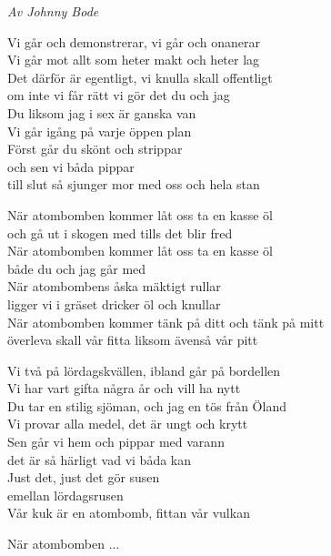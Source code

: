 {\footnotesize\textit{Av Johnny Bode}}\par
\vspace{10pt}
Vi går och demonstrerar, vi går och onanerar\\
Vi går mot allt som heter makt och heter lag\\
Det därför är egentligt, vi knulla skall offentligt\\
om inte vi får rätt vi gör det du och jag\\
Du liksom jag i sex är ganska van\\
Vi går igång på varje öppen plan\\
Först går du skönt och strippar\\
och sen vi båda pippar\\
till slut så sjunger mor med oss och hela stan\par
\vspace{7pt}
När atombomben kommer låt oss ta en kasse öl\\
och gå ut i skogen med tills det blir fred\\
När atombomben kommer låt oss ta en kasse öl\\
både du och jag går med\\
När atombombens åska mäktigt rullar\\
ligger vi i gräset dricker öl och knullar\\
När atombomben kommer tänk på ditt och tänk på mitt\\
överleva skall vår fitta liksom ävenså vår pitt\par
\vspace{7pt}
Vi två på lördagskvällen, ibland går på bordellen\\
Vi har vart gifta några år och vill ha nytt\\
Du tar en stilig sjöman, och jag en tös från Öland\\
Vi provar alla medel, det är ungt och krytt\\
Sen går vi hem och pippar med varann\\
det är så härligt vad vi båda kan\\
Just det, just det gör susen\\
emellan lördagsrusen\\
Vår kuk är en atombomb, fittan vår vulkan\par
\vspace{7pt}
När atombomben ...
